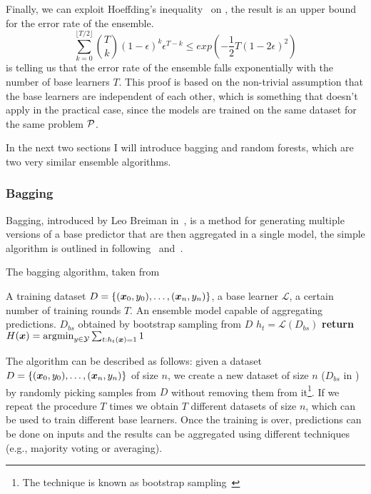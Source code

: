Finally, we can exploit Hoeffding's inequality~\cite{ZhouZhi-Hua2021ML} on
, the result is an upper bound for the error rate of the ensemble.
\begin{equation}
	\label{eq:hoeffding}
	\sum_{k = 0}^{\lfloor T / 2 \rfloor}\binom{T}{k} (1 - \epsilon)^k\epsilon^{T - k} \leq
	exp\left(-\frac{1}{2}T(1 - 2\epsilon)^2\right)
\end{equation}
 is telling us that the error rate of the ensemble falls exponentially with the
number of base learners $T$. This proof is based on the non-trivial assumption that the base
learners are independent of each other, which is something that doesn't apply in the practical
case, since the models are trained on the same dataset for the same problem $\mathcal{P}$.

\medskip

In the next two sections I will introduce bagging and random forests, which are two very similar
ensemble algorithms.

\subsubsection{Bagging}

Bagging, introduced by Leo Breiman in~\cite{Breiman1996}, is a method for generating multiple
versions of a base predictor that are then aggregated in a single model, the simple algorithm is
outlined in  following~\cite{ZhouZhi-Hua2021ML} and~\cite{Bauer1999}.
\begin{algorithm}
	\caption{The bagging algorithm, taken from~\cite{Bauer1999}}\label{algo:bagging}
	\begin{algorithmic}[1]
		\Require A training dataset $D = \{(\boldsymbol{x}_0, y_0), \ldots, (\boldsymbol{x}_n, y_n)\}$, a base learner $\mathcal{L}$, a certain number
		of training rounds $T$.
		\Ensure An ensemble model capable of aggregating predictions.
		\State $D_{bs}$ obtained by bootstrap sampling from $D$
		\State $h_t = \mathcal{L}(D_{bs})$ 
		\EndFor
		\State \textbf{return} $H(\boldsymbol{x}) = \operatorname*{\arg\!\min}_{y \in \mathcal{Y}}\sum_{t : h_t(\boldsymbol{x}) =
		1} 1$
		\EndFunction
	\end{algorithmic}
\end{algorithm}

The algorithm can be described as follows: given a dataset $D = \{(\boldsymbol{x}_0, y_0), \ldots, (\boldsymbol{x}_n, y_n)\}$ of size $n$, we create a new
dataset of size $n$ ($D_{bs}$ in ) by randomly picking samples from $D$ without
removing them from it\footnote{The technique is known as bootstrap sampling~\cite{ZhouZhi-Hua2021ML}}. If we repeat the procedure $T$ times we obtain $T$ different datasets of size $n$, which can be used to train different base learners. Once the training is over, predictions can be done on inputs and the results can be aggregated using different techniques (e.g., majority voting or averaging).

